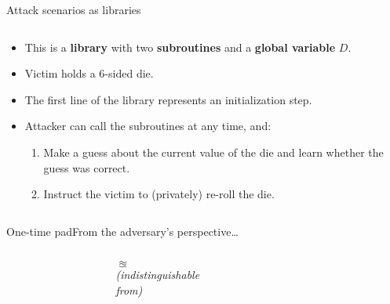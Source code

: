 \documentclass[aspectratio=169, lualatex, handout]{beamer}
\begin{document}
\begin{frame}{Attack scenarios as libraries}
	\begin{columns}[c]
		\begin{column}{0.65\textwidth}
			\begin{itemize}
				\item This is a \textbf{library} with two \textbf{subroutines} and a \textbf{global variable} $D$.
				\item Victim holds a 6-sided die.
				\item The first line of the library represents an initialization step.
				\item Attacker can call the subroutines at any time, and:
				      \begin{enumerate}
					      \item Make a guess about the current value of the die and learn whether the guess was correct.
					      \item Instruct the victim to (privately) re-roll the die.
				      \end{enumerate}
			\end{itemize}
		\end{column}
		\begin{column}{0.35\textwidth}
			\vspace{-1cm}
			\begin{center}
			\end{center}
		\end{column}
	\end{columns}
\end{frame}

\begin{frame}{One-time pad}{From the adversary's perspective\ldots}
	\begin{columns}[c]
		\begin{column}{0.35\textwidth}
		\end{column}
		\begin{column}{0.3\textwidth}
			\begin{center}
				{\huge{$\approxeq$}} \\[1em]
				{\scriptsize\textit{(indistinguishable \\ from)}}
			\end{center}
		\end{column}
		\begin{column}{0.35\textwidth}
		\end{column}
	\end{columns}
\end{frame}
\end{document}
